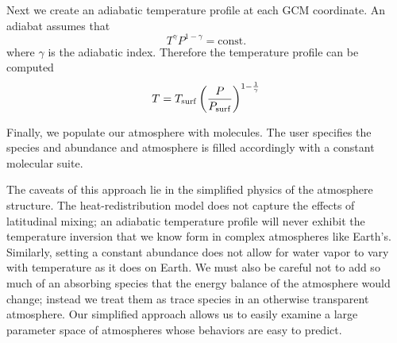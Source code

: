 \documentclass[twocolumn]{aastex631}
\begin{document}
Next we create an adiabatic temperature profile at each GCM coordinate. An adiabat assumes that
\begin{equation}
    T^\gamma P^{1 - \gamma} = \text{const.}
\end{equation}
where $\gamma$ is the adiabatic index. Therefore the temperature profile can be computed
\begin{equation}
    T = T_{\rm surf} \left(\frac{P}{P_{\rm surf}} \right)^{1 - \frac{1}{\gamma} }
\end{equation}

Finally, we populate our atmosphere with molecules. The user specifies the species and abundance and atmosphere is filled accordingly with a constant molecular suite.

The caveats of this approach lie in the simplified physics of the atmosphere structure. The heat-redistribution model does not
capture the effects of latitudinal mixing; an adiabatic temperature profile will never exhibit the temperature inversion
that we know form in complex atmospheres like Earth's. Similarly, setting a constant abundance does not allow for water vapor to
vary with temperature as it does on Earth. We must also be careful not to add so much of an absorbing species that the energy balance of
the atmosphere would change; instead we treat them as trace species in an otherwise transparent atmosphere. Our simplified approach
allows us to easily examine a large parameter space of atmospheres whose behaviors are easy to predict.





\end{document}
